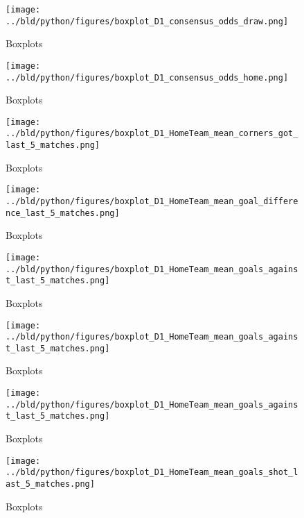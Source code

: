 \documentclass[11pt, a4paper, leqno]{article}
\begin{document}
\begin{figure}[H]
    \centering
    \texttt{[image: ../bld/python/figures/boxplot\_D1\_consensus\_odds\_draw.png]}
    \caption{Boxplots}
    \label{fig:figure2}
\end{figure}

\begin{figure}[H]
    \centering
    \texttt{[image: ../bld/python/figures/boxplot\_D1\_consensus\_odds\_home.png]}
    \caption{Boxplots}
    \label{fig:figure2}
\end{figure}

\begin{figure}[H]
    \centering
    \texttt{[image: ../bld/python/figures/boxplot\_D1\_HomeTeam\_mean\_corners\_got\_last\_5\_matches.png]}
    \caption{Boxplots}
    \label{fig:figure2}
\end{figure}

\begin{figure}[H]
    \centering
    \texttt{[image: ../bld/python/figures/boxplot\_D1\_HomeTeam\_mean\_goal\_difference\_last\_5\_matches.png]}
    \caption{Boxplots}
    \label{fig:figure2}
\end{figure}


\begin{figure}[H]
    \centering
    \texttt{[image: ../bld/python/figures/boxplot\_D1\_HomeTeam\_mean\_goals\_against\_last\_5\_matches.png]}
    \caption{Boxplots}
    \label{fig:figure2}
\end{figure}

\begin{figure}[H]
    \centering
    \texttt{[image: ../bld/python/figures/boxplot\_D1\_HomeTeam\_mean\_goals\_against\_last\_5\_matches.png]}
    \caption{Boxplots}
    \label{fig:figure2}
\end{figure}

\begin{figure}[H]
    \centering
    \texttt{[image: ../bld/python/figures/boxplot\_D1\_HomeTeam\_mean\_goals\_against\_last\_5\_matches.png]}
    \caption{Boxplots}
    \label{fig:figure2}
\end{figure}


\begin{figure}[H]
    \centering
    \texttt{[image: ../bld/python/figures/boxplot\_D1\_HomeTeam\_mean\_goals\_shot\_last\_5\_matches.png]}
    \caption{Boxplots}
    \label{fig:figure2}
\end{figure}
\end{document}
